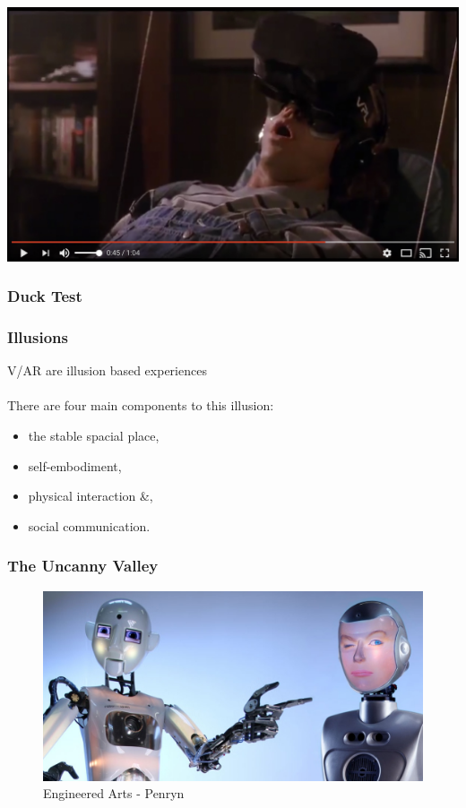 \begin{frame}
	\begin{center}
		\href{https://www.youtube.com/watch?v=gvozcv8pS3c}{ \includegraphics[scale=.3]{assets/mower}  }
	\end{center}
\end{frame}

\begin{frame}
	\frametitle{Duck Test}
	
\end{frame}
	

\begin{frame}
	\frametitle{Illusions}
	V/AR are illusion based experiences \\~\\ 
	
	There are four main components to this illusion:
	\begin{itemize}
		\item the stable spacial place,
		\item self-embodiment,
		\item physical interaction \&,
		\item social communication.
	\end{itemize}
	
\end{frame}

\begin{frame}
	\frametitle{The Uncanny Valley}
	\begin{figure}
		 \includegraphics[scale=.3]{assets/bots}  
		 \caption{Engineered Arts - Penryn}
	\end{figure}
\end{frame}

